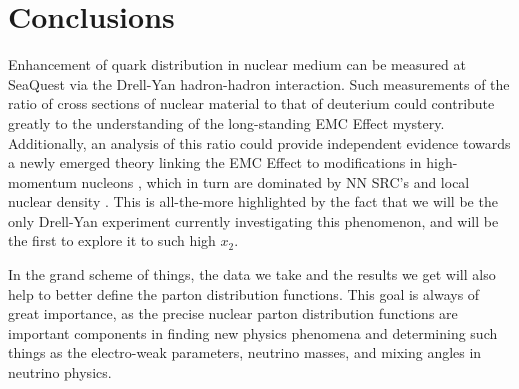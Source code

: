 \documentclass[11pt]{article}
\begin{document}
\section{Conclusions}
Enhancement of quark distribution in nuclear medium can be measured at SeaQuest via the Drell-Yan hadron-hadron interaction. Such measurements of the ratio of cross sections of nuclear material to that of deuterium could contribute greatly to the understanding of the long-standing EMC Effect mystery. Additionally, an analysis of this ratio could provide independent evidence towards a newly emerged theory linking the EMC Effect to modifications in high-momentum nucleons \cite{PhysRevC.76.055206}, which in turn are dominated by NN SRC's and local nuclear density \cite{Weinstein:2010rt}. This is all-the-more highlighted by the fact that we will be the only Drell-Yan experiment currently investigating this phenomenon, and will be the first to explore it to such high $x_2$.

In the grand scheme of things, the data we take and the results we get will also help to better define the parton distribution functions. This goal is always of great importance, as the precise nuclear parton distribution functions are important components in finding new physics phenomena and determining such things as the electro-weak parameters, neutrino masses, and mixing angles in neutrino physics.

\bigskip


\end{document}
